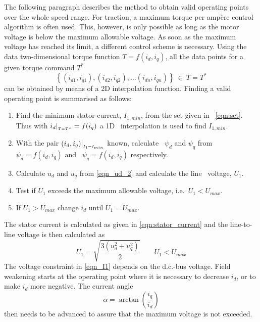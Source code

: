 The following paragraph describes the method to obtain valid operating points over the whole speed range. For traction, a maximum torque per amp\`ere control algorithm is often used. This, however, is only possible as long as the motor voltage is below the maximum allowable voltage. As soon as the maximum voltage has reached its limit, a different control scheme is necessary. Using the data two-dimensional torque function $T=f(i_{d},i_{q})$, all the data points for a given torque command $T^{*}$
\begin{equation}\label{eqn:set}
  \left\{(i_{d1},i_{q1}),(i_{d2},i_{q2}),\ldots(i_{dn},i_{qn})\right\}\: \in \: T=T^{*}
\end{equation} 
can be obtained by means of a 2D interpolation function. Finding a valid operating point is summarised as follows:
\begin{enumerate}
	\item Find the minimum stator current, $I_{1,min}$, from the set given in~%
	\eqref{eqn:set}. Thus with $i_{d}\arrowvert_{_{T=T^{*}}}=f(i_{q})$ a 1D~%
	interpolation is used to find $I_{1,min}$.
	\item With the pair $(i_{d},i_{q}){\arrowvert_{_{I_{1}=I_{min}}}}$ known, calculate~%
	$\psi_{d}$ and $\psi_{q}$ from $\psi_{d}=f(i_{d},i_{q})$ and~%
	$\psi_{q}=f(i_{d},i_{q})$ respectively.
	\item Calculate $u_{d}$ and $u_{q}$ from \eqref{eqn_ud_2} and calculate the line~%
	voltage, $U_{1}$.
	\item Test if $U_{1}$ exceeds the maximum allowable voltage, i.e.~$U_{1}<U_{max}$. 
	\item If $U_{1}>U_{max}$ change $i_{d}$ until $U_{1}=U_{max}$.
\end{enumerate}
The stator current is calculated as given in \eqref{eqn:stator_current} and the line-to-line voltage is then calculated as
\begin{equation} 
  \label{eqn_I1}
  U_{1} = \sqrt{\frac{3\left(u_{d}^2+u_{q}^2\right)}{2}} \qquad U_{1}<U_{max}
\end{equation}
The voltage constraint in \eqref{eqn_I1} depends on the d.c.-bus voltage. Field weakening starts at the operating point where it is necessary to decrease $i_{d}$, or to make $i_{d}$ more negative. The current angle
\begin{equation}
  \alpha = \arctan\left(\frac{i_{q}}{i_{d}}\right)
\end{equation} 
then needs to be advanced to assure that the maximum voltage is not exceeded. 

